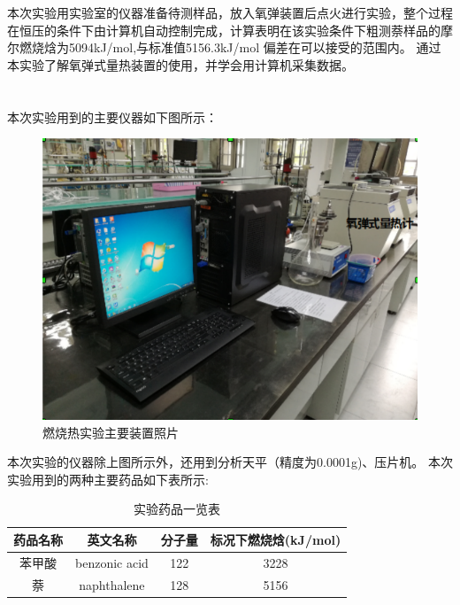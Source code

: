 ﻿\documentclass[10.5pt]{ctexart}
\begin{document}
\title{\textbf{}} %
\author{}
\date{}
\maketitle
\section{\textbf{}}
本次实验用实验室的仪器准备待测样品，放入氧弹装置后点火进行实验，整个过程在恒压的条件下由计算机自动控制完成，计算表明在该实验条件下粗测萘样品的摩尔燃烧焓为5094kJ/mol,与标准值5156.3kJ/mol 偏差在可以接受的范围内。
通过本实验了解氧弹式量热装置的使用，并学会用计算机采集数据。
\section{\textbf{}}
\subsection{\textbf{}}
本次实验用到的主要仪器如下图所示：
\begin{figure}[!ht]
\centering
\caption{燃烧热实验主要装置照片}
\includegraphics[width=400pt]{Equipment01.png}
\end{figure}


本次实验的仪器除上图所示外，还用到分析天平（精度为0.0001g)、压片机。
本次实验用到的两种主要药品如下表所示:
\newpage
\begin{table}[!ht]
\centering
\caption{实验药品一览表}
\begin{tabular}{cccc}
\hline
药品名称 & 英文名称 & 分子量 & 标况下燃烧焓(kJ/mol)\\
\hline
苯甲酸 & benzonic acid & 122 & 3228\\
萘 & naphthalene & 128 & 5156 \\
\hline
\end{tabular}
\end{table}
\end{document}
